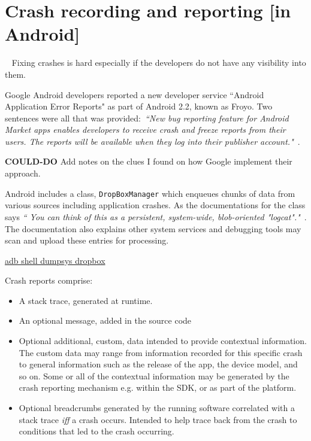 \chapter{Crash recording and reporting [in Android]}~\label{app:crash-recording-and-reporting-in-android}
Fixing crashes is hard especially if the developers do not have any visibility into them. 


Google Android developers reported a new developer service ``Android Application Error Reports" as part of Android 2.2, known as Froyo. Two sentences were all that was provided:~\emph{``New bug reporting feature for Android Market apps enables developers to receive crash and freeze reports from their users. The reports will be available when they log into their publisher account."}~\citep{android2010_froyo_highlights_new_developer_services}.

\textbf{COULD-DO} Add notes on the clues I found on how Google implement their approach.

Android includes a class, \texttt{DropBoxManager} which enqueues chunks of data from various sources including application crashes. As the documentations for the class says \emph{`` You can think of this as a persistent, system-wide, blob-oriented "logcat"."}~\citep{android_dropboxmanager}. The documentation also explains other system services and debugging tools may scan and upload these entries for processing.


\href{https://github.com/operando/Android-Command-Note}{adb shell dumpsys dropbox}

Crash reports comprise:
\begin{itemize}
    \item A stack trace, generated at runtime. %
    \item An optional message, added in the source code
    \item Optional additional, custom, data intended to provide contextual information. The custom data may range from information recorded for this specific crash to general information such as the release of the app, the device model, and so on. Some or all of the contextual information may be generated by the crash reporting mechanism e.g. within the SDK, or as part of the platform.
    \item Optional breadcrumbs generated by the running software correlated with a stack trace \emph{iff} a crash occurs. Intended to help trace back from the crash to conditions that led to the crash occurring. %
\end{itemize}

